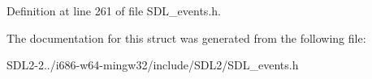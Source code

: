 Definition at line 261 of file S\+D\+L\+\_\+events.\+h.



The documentation for this struct was generated from the following file\+:\begin{DoxyCompactItemize}
\item 
S\+D\+L2-\/2../i686-\/w64-\/mingw32/include/\+S\+D\+L2/S\+D\+L\+\_\+events.\+h\end{DoxyCompactItemize}
